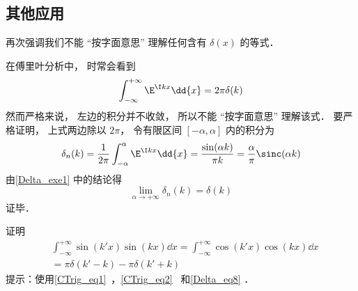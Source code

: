 \subsection{其他应用}
再次强调我们不能 “按字面意思” 理解任何含有 $\delta(x)$ 的等式．
\begin{example}{}\label{Delta_ex1}
在傅里叶分析中， 时常会看到
\begin{equation}\label{Delta_eq8}
\int_{-\infty}^{+\infty} \E^{\I kx}\dd{x} = 2\pi \delta(k)
\end{equation}
然而严格来说， 左边的积分并不收敛， 所以不能 “按字面意思” 理解该式． 要严格证明， 上式两边除以 $2\pi$， 令有限区间 $[-\alpha,\alpha]$ 内的积分为
\begin{equation}
\delta_n(k) = \frac{1}{2\pi}\int_{-\alpha}^{\alpha} \E^{\I kx}\dd{x} = \frac{\sin(\alpha k)}{\pi k} = \frac{\alpha}{\pi} \sinc(\alpha k)
\end{equation}
由\autoref{Delta_exe1} 中的结论得
\begin{equation}
\lim_{\alpha\to+\infty} \delta_n(k) = \delta(k)
\end{equation}
证毕．
\end{example}

\begin{exercise}{}
证明
\begin{equation}\label{Delta_eq9}
\begin{aligned}%
&\int_{-\infty}^{+\infty} \sin(k'x) \sin(kx) \dd{x} = \int_{-\infty}^{+\infty} \cos(k'x) \cos(kx) \dd{x}\\
&= \pi\delta(k' - k) - \pi\delta(k' + k)
\end{aligned}
\end{equation}
提示：使用\autoref{CTrig_eq1}~，\autoref{CTrig_eq2}~ 和\autoref{Delta_eq8} ．
\end{exercise}

